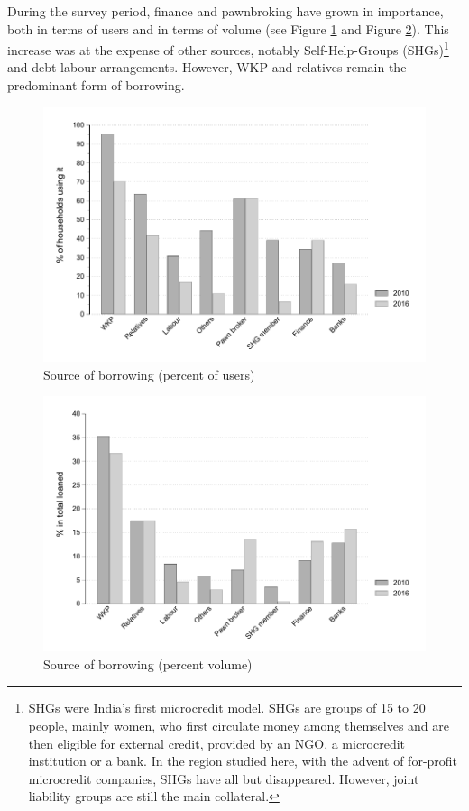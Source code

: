 \documentclass[a4paper, 11pt, onecolumn]{article}
\begin{document}
During the survey period, finance and pawnbroking have grown in importance, both in terms of users and in terms of volume (see Figure \ref{bar:clientele} and Figure \ref{bar:loaned}). 
This increase was at the expense of other sources, notably Self-Help-Groups (SHGs)\footnote{SHGs were India's first microcredit model. SHGs are groups of 15 to 20 people, mainly women, who first circulate money among themselves and are then eligible for external credit, provided by an NGO, a microcredit institution or a bank. In the region studied here, with the advent of for-profit microcredit companies, SHGs have all but disappeared. However, joint liability groups are still the main collateral.}  and debt-labour arrangements. 
However, WKP and relatives remain the predominant form of borrowing.

\begin{figure}[ht]
\center
\includegraphics[width=12cm]{totalclientele.pdf}
\caption{Source of borrowing (percent of users)}
\label{bar:clientele}
\end{figure}

\begin{figure}[ht]
\center
\includegraphics[width=12cm]{totalloaned.pdf}
\caption{Source of borrowing (percent volume)}
\label{bar:loaned}
\end{figure}
\end{document}
